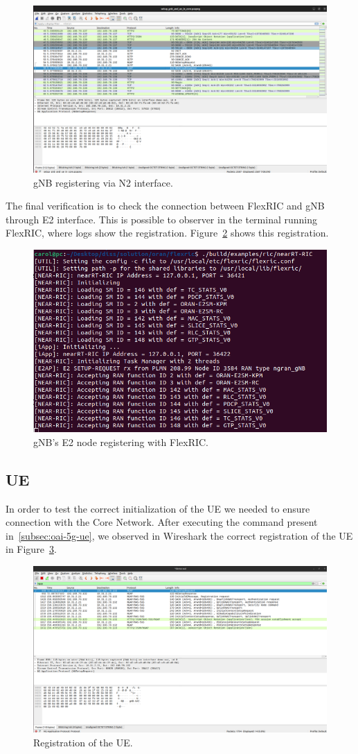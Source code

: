 \begin{figure}[H]
    \centering
    \includegraphics[width=0.5\linewidth]{figures/register_gnb}
    \caption[gNB registering via N2 interface]{gNB registering via N2 interface.}
    \label{fig:gnb_reg}
\end{figure}

The final verification is to check the connection between FlexRIC and gNB through E2 interface.
This is possible to observer in the terminal running FlexRIC, where logs show the registration.
Figure~\ref{fig:gnb_e2} shows this registration.

\begin{figure}[H]
    \centering
    \includegraphics[width=0.5\linewidth]{figures/gnb_e2_flexric}
    \caption[gNB's E2 node registering with FlexRIC]{gNB's E2 node registering with FlexRIC.}
    \label{fig:gnb_e2}
\end{figure}

\subsection{UE}\label{subsec:ue}

In order to test the correct initialization of the UE we needed to ensure connection with the Core Network.
After executing the command present in~\ref{subsec:oai-5g-ue}, we observed in Wireshark the correct registration of the UE in Figure~\ref{fig:registration_ue}.

\begin{figure}[H]
    \centering
    \includegraphics[width=0.5\linewidth]{figures/ue_registration}
    \caption{Registration of the UE.}
    \label{fig:registration_ue}
\end{figure}

